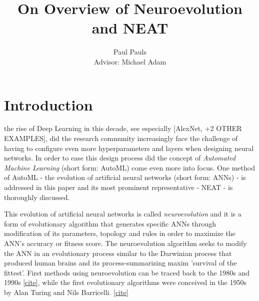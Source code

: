 \documentclass[journal, a4paper]{IEEEtran}
\begin{document}
\title{On Overview of Neuroevolution and NEAT}
\author{Paul Pauls\\
        Advisor: Michael Adam}
\maketitle



\begin{abstract}
    \blindtext
\end{abstract}






\section{Introduction}

 the rise of Deep Learning in this decade, see especially [AlexNet, +2 OTHER EXAMPLES], did the research community increasingly face the challenge of having to configure even more hyperparameters and layers when designing neural networks. In order to ease this design process did the concept of \textit{Automated Machine Learning} (short form: AutoML) come even more into focus. One method of AutoML - the evolution of artificial neural networks (short form: ANNs) - is addressed in this paper and its most prominent representative - NEAT - is thoroughly discussed. 

This evolution of artificial neural networks is called \textit{neuroevolution} and it is a form of evolutionary algorithm that generates specific ANNs through modification of its parameters, topology and rules in order to maximize the ANN's accuracy or fitness score. The neuroevolution algorithm seeks to modify the ANN in an evolutionary process similar to the Darwinian process that produced human brains and its process-summarizing maxim 'survival of the fittest'. First methods using neuroevolution can be traced back to the 1980s and 1990s \href{https://www.inovex.de/blog/neuroevolution/}{[cite]}, while the first evolutionary algorithms were conceived in the 1950s by Alan Turing and Nils Barricelli. \href{https://en.wikipedia.org/wiki/Genetic_algorithm#cite_note-mind.oxfordjournals.org-33}{[cite]}
\end{document}

